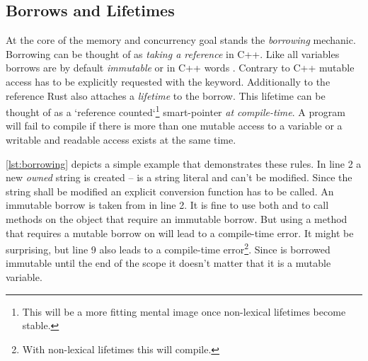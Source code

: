 \documentclass[thesis]{subfiles}
\begin{document}
  \subsection{Borrows and Lifetimes}
    At the core of the memory and concurrency goal stands the \emph{borrowing} mechanic.
    Borrowing can be thought of as \emph{taking a reference} in C++.
    Like all variables borrows are by default \emph{immutable} or in C++ words .
    Contrary to C++ mutable access has to be explicitly requested with the  keyword.
    Additionally to the reference Rust also attaches a \emph{lifetime} to the borrow.
    This lifetime can be thought of as a `reference counted`\footnote{%
      This will be a more fitting mental image once non-lexical lifetimes become stable.
    } smart-pointer \emph{at compile-time}.
    A program will fail to compile if there is more than one mutable access to a variable or a writable and readable access exists at the same time.

    

    \autoref{lst:borrowing} depicts a simple example that demonstrates these rules.
    In line 2 a new \emph{owned} string is created --  is a string literal and can't be modified.
    Since the string shall be modified an explicit conversion function has to be called.
    An immutable borrow is taken from  in line 2.
    It is fine to use both  and  to call methods on the object that require an immutable borrow.
    But using a method that requires a mutable borrow on  will lead to a compile-time error.
    It might be surprising, but line 9 also leads to a compile-time error\footnote{%
      With non-lexical lifetimes this will compile.
    }.
    Since  is borrowed immutable until the end of the scope it doesn't matter that it is a mutable variable.

    \newsavebox{\lifetimeErrBox}
    \begin{lrbox}{\lifetimeErrBox}%
      \begin{minipage}{.45\linewidth}
        
      \end{minipage}
    \end{lrbox}
\end{document}
